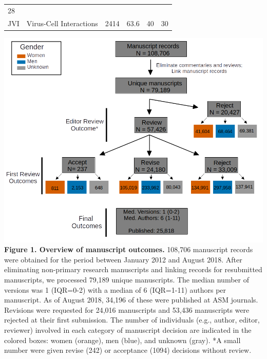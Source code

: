 \documentclass[11pt,]{article}
\begin{document}
\begin{longtable}[]{@{}llrrrr@{}}
\begin{minipage}[t]{0.11\columnwidth}
28\strut
\end{minipage}\tabularnewline
\begin{minipage}[t]{0.06\columnwidth}\raggedright\strut
JVI\strut
\end{minipage} & \begin{minipage}[t]{0.43\columnwidth}\raggedright\strut
Virus-Cell Interactions\strut
\end{minipage} & \begin{minipage}[t]{0.04\columnwidth}\raggedleft\strut
2414\strut
\end{minipage} & \begin{minipage}[t]{0.08\columnwidth}\raggedleft\strut
63.6\strut
\end{minipage} & \begin{minipage}[t]{0.11\columnwidth}\raggedleft\strut
40\strut
\end{minipage} & \begin{minipage}[t]{0.11\columnwidth}\raggedleft\strut
30\strut
\end{minipage}\tabularnewline
\bottomrule
\end{longtable}

\newpage

\includegraphics{population_diagram.png} \textbf{Figure 1. Overview of
manuscript outcomes.} 108,706 manuscript records were obtained for the
period between January 2012 and August 2018. After eliminating
non-primary research manuscripts and linking records for resubmitted
manuscripts, we processed 79,189 unique manuscripts. The median number
of versions was 1 (IQR=0-2) with a median of 6 (IQR=1-11) authors per
manuscript. As of August 2018, 34,196 of these were published at ASM
journals. Revisions were requested for 24,016 manuscripts and 53,436
manuscripts were rejected at their first submission. The number of
individuals (e.g., author, editor, reviewer) involved in each category
of manuscript decision are indicated in the colored boxes: women
(orange), men (blue), and unknown (gray). *A small number were given
revise (242) or acceptance (1094) decisions without review.
\end{document}
